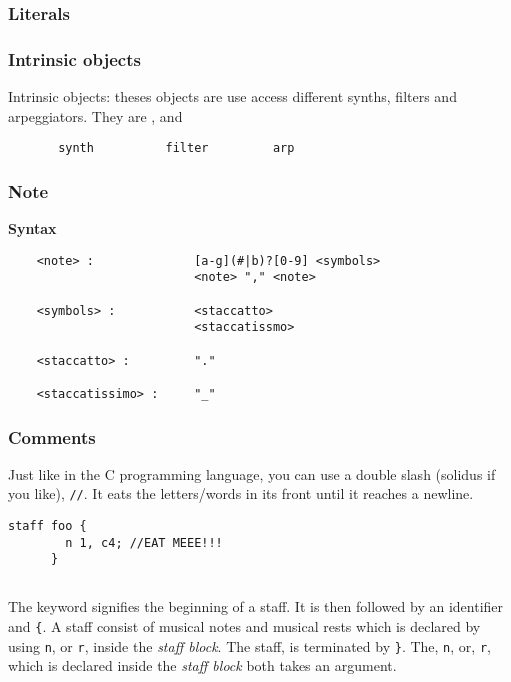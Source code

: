\subsubsection{Literals}


\subsubsection{Intrinsic objects}

\np Intrinsic objects: theses objects are use access different synths, filters and
arpeggiators. They are ,  and 

\begin{verbatim}
       synth          filter         arp
\end{verbatim}

\subsubsection{Note}

\np \textbf{Syntax}

\begin{verbatim}
    <note> :              [a-g](#|b)?[0-9] <symbols>
                          <note> "," <note>
    
    <symbols> :           <staccatto>
                          <staccatissmo>
    
    <staccatto> :         "."
    
    <staccatissimo> :     "_"

\end{verbatim}

\subsubsection{Comments}
\np Just like in the C programming language, you can use a double slash (solidus if you like), \verb+//+.
It eats the letters/words in its front until it reaches a newline.
\begin{Verbatim}[frame=single]
      staff foo {
        n 1, c4; //EAT MEEE!!!
      }
\end{Verbatim}

\subsection{}
\np The  keyword signifies the beginning of a staff. It is then followed by an identifier and \verb+{+. A staff consist of
musical notes and musical rests which is declared by using \verb+n+, or \verb+r+, inside the \textit{staff block}.
The staff, is terminated by \verb+}+. The, \verb+n+, or, \verb+r+, which is declared inside the \textit{staff block} both takes an argument.

